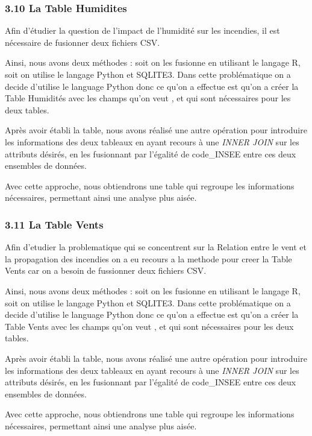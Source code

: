 \documentclass[
]{article}
\begin{document}
\subsubsection{3.10 La Table Humidites}\label{la-table-humidites}

Afin d'étudier la question de l'impact de l'humidité sur les incendies,
il est nécessaire de fusionner deux fichiers CSV.

Ainsi, nous avons deux méthodes : soit on les fusionne en utilisant le
langage R, soit on utilise le langage Python et SQLITE3. Dans cette
problématique on a decide d'utilise le language Python donc ce qu'on a
effectue est qu'on a créer la Table Humidités avec les champs qu'on veut
, et qui sont nécessaires pour les deux tables.

Après avoir établi la table, nous avons réalisé une autre opération pour
introduire les informations des deux tableaux en ayant recours à une
\emph{INNER JOIN} sur les attributs désirés, en les fusionnant par
l'égalité de code\_INSEE entre ces deux ensembles de données.

Avec cette approche, nous obtiendrons une table qui regroupe les
informations nécessaires, permettant ainsi une analyse plus aisée.

\subsubsection{3.11 La Table Vents}\label{la-table-vents}

Afin d'etudier la problematique qui se concentrent sur la Relation entre
le vent et la propagation des incendies on a eu recours a la methode
pour creer la Table Vents car on a besoin de fussionner deux fichiers
CSV.

Ainsi, nous avons deux méthodes : soit on les fusionne en utilisant le
langage R, soit on utilise le langage Python et SQLITE3. Dans cette
problématique on a decide d'utilise le language Python donc ce qu'on a
effectue est qu'on a créer la Table Vents avec les champs qu'on veut ,
et qui sont nécessaires pour les deux tables.

Après avoir établi la table, nous avons réalisé une autre opération pour
introduire les informations des deux tableaux en ayant recours à une
\emph{INNER JOIN} sur les attributs désirés, en les fusionnant par
l'égalité de code\_INSEE entre ces deux ensembles de données.

Avec cette approche, nous obtiendrons une table qui regroupe les
informations nécessaires, permettant ainsi une analyse plus aisée.
\end{document}
